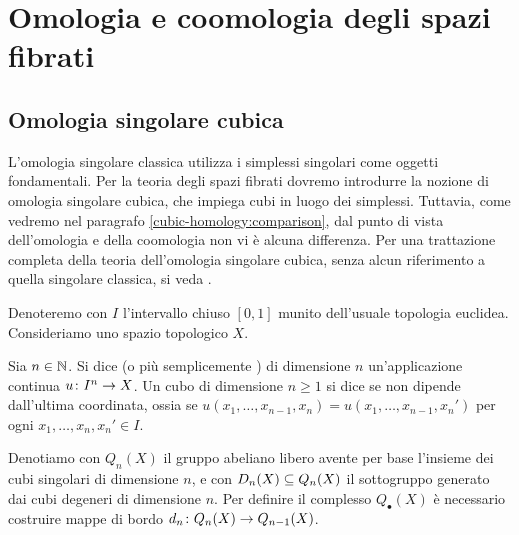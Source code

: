 \chapter{Omologia e coomologia degli spazi fibrati}
\label{ch:homology-and-cohomology-of-fibrations}
\section{Omologia singolare cubica}

L'omologia singolare classica utilizza i simplessi singolari come oggetti fondamentali. Per la teoria degli spazi fibrati dovremo introdurre la nozione di omologia singolare cubica, che impiega cubi in luogo dei simplessi. Tuttavia, come vedremo nel paragrafo \ref{cubic-homology:comparison}, dal punto di vista dell'omologia e della coomologia non vi è alcuna differenza. Per una trattazione completa della teoria dell'omologia singolare cubica, senza alcun riferimento a quella singolare classica, si veda \cite{massey}.

Denoteremo con \(I\) l'intervallo chiuso \([0,1]\) munito dell'usuale topologia euclidea. Consideriamo uno spazio topologico \(X\).

\begin{definition}
Sia \(n\in\mathbb{N}\). Si dice  (o più semplicemente ) di dimensione \(n\) un'applicazione continua \(\map{u}{I^n}{X}\). Un cubo di dimensione \(n\ge 1\) si dice  se non dipende dall'ultima coordinata, ossia se \(u(x_1,\ldots,x_{n-1},x_n)=u(x_1,\ldots,x_{n-1},x_n')\) per ogni \(x_1,\ldots,x_n,x_n'\in I\).
\end{definition}

Denotiamo con \(Q_n(X)\) il gruppo abeliano libero avente per base l'insieme dei cubi singolari di dimensione \(n\), e con \(D_n(X)\subseteq Q_n(X)\) il sottogruppo generato dai cubi degeneri di dimensione \(n\). Per definire il complesso \(Q_\bullet(X)\) è necessario costruire mappe di bordo \(\map{d_n}{Q_n(X)}{Q_{n-1}(X)}\).

